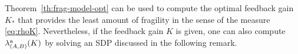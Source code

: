 \documentclass[9pt,shortpaper,twoside,web]{ieeecolor}
\DeclareMathOperator{\im}{im}
\begin{document}


Theorem~\ref{th:frag-model-opt} can be used to compute the optimal feedback gain $K_*$ that provides the least amount of fragility in the sense of the measure \eqref{eq:rhoK}. Nevertheless, if the feedback gain $K$ is given, one can also compute $\lambda_{(A,B)}^\textup{a}(K)$ by solving an SDP discussed in the following remark. 
\end{document}
